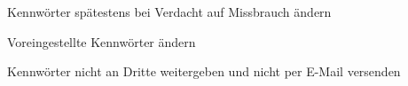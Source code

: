 \item Kennwörter spätestens bei Verdacht auf Missbrauch ändern
\item Voreingestellte Kennwörter ändern
\item Kennwörter nicht an Dritte weitergeben und nicht per E-Mail versenden